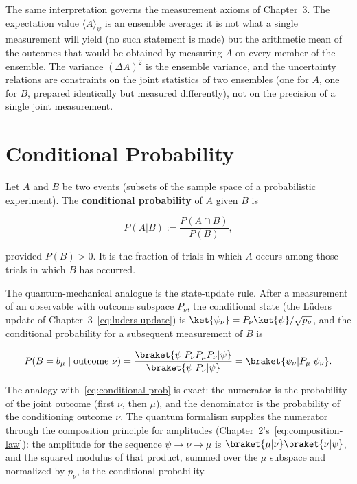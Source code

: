 The same interpretation governs the measurement axioms of Chapter~3. The expectation value $\langle A \rangle_\psi$ is an ensemble average: it is not what a single measurement will yield (no such statement is made) but the arithmetic mean of the outcomes that would be obtained by measuring $A$ on every member of the ensemble. The variance $(\Delta A)^2$ is the ensemble variance, and the uncertainty relations are constraints on the joint statistics of two ensembles (one for $A$, one for $B$, prepared identically but measured differently), not on the precision of a single joint measurement.

\section{Conditional Probability}
\label{sec:conditional-probability}

Let $A$ and $B$ be two events (subsets of the sample space of a probabilistic experiment). The \textbf{conditional probability} of $A$ given $B$ is
\begin{linenomath}
    \begin{equation}
        P(A|B) := \frac{P(A \cap B)}{P(B)},
        \label{eq:conditional-prob}
    \end{equation}
\end{linenomath}
provided $P(B) > 0$. It is the fraction of trials in which $A$ occurs among those trials in which $B$ has occurred.

The quantum-mechanical analogue is the state-update rule. After a measurement of an observable with outcome subspace $P_\nu$, the conditional state (the L\"uders update of Chapter~3~\eqref{eq:luders-update}) is $\ket{\psi_\nu} = P_\nu\ket{\psi}/\sqrt{p_\nu}$, and the conditional probability for a subsequent measurement of $B$ is
\begin{linenomath}
    \begin{equation}
        P(B = b_\mu \mid \text{outcome } \nu) = \frac{\braket{\psi|P_\nu P_\mu P_\nu|\psi}}{\braket{\psi|P_\nu|\psi}} = \braket{\psi_\nu|P_\mu|\psi_\nu}.
        \label{eq:qm-conditional}
    \end{equation}
\end{linenomath}
The analogy with~\eqref{eq:conditional-prob} is exact: the numerator is the probability of the joint outcome (first $\nu$, then $\mu$), and the denominator is the probability of the conditioning outcome $\nu$. The quantum formalism supplies the numerator through the composition principle for amplitudes (Chapter~2's~\eqref{eq:composition-law}): the amplitude for the sequence $\psi \to \nu \to \mu$ is $\braket{\mu|\nu}\braket{\nu|\psi}$, and the squared modulus of that product, summed over the $\mu$ subspace and normalized by $p_\nu$, is the conditional probability.

